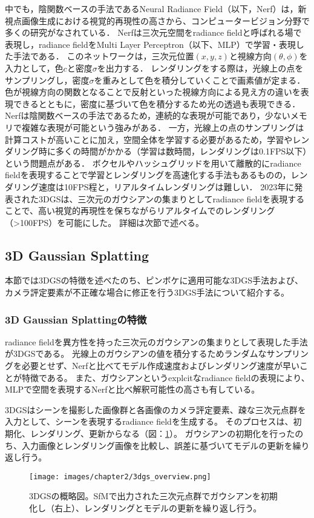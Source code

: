中でも，陰関数ベースの手法であるNeural Radiance Field（以下，Nerf）\cite{nerf}は，新視点画像生成における視覚的再現性の高さから、コンピュータービジョン分野で多くの研究がなされている．
Nerfは三次元空間をradiance fieldと呼ばれる場で表現し，radiance fieldをMulti Layer Perceptron（以下、MLP）で学習・表現した手法である．
このネットワークは，三次元位置$(x,y,z)$と視線方向$(\theta, \phi)$を入力として，色$c$と密度$\sigma$を出力する．
レンダリングをする際は，光線上の点をサンプリングし，密度$\sigma$を重みとして色を積分していくことで画素値が定まる．
色が視線方向の関数となることで反射といった視線方向による見え方の違いを表現できるとともに，密度に基づいて色を積分するため光の透過も表現できる．
Nerfは陰関数ベースの手法であるため，連続的な表現が可能であり，少ないメモリで複雑な表現が可能という強みがある．
一方，光線上の点のサンプリングは計算コストが高いことに加え，空間全体を学習する必要があるため，学習やレンダリング時に多くの時間がかかる（学習は数時間，レンダリングは0.1FPS以下）という問題点がある\cite{3dgs}．
ボクセルやハッシュグリッドを用いて離散的にradiance fieldを表現することで学習とレンダリングを高速化する手法もある\cite{plenoxels}\cite{instant-ngp}ものの，レンダリング速度は10FPS程と，リアルタイムレンダリングは難しい．
2023年に発表された3DGS\cite{3dgs}は、三次元のガウシアンの集まりとしてradiance fieldを表現することで、高い視覚的再現性を保ちながらリアルタイムでのレンダリング（>100FPS）を可能にした。
詳細は次節で述べる。

\subsection{3D Gaussian Splatting}\label{subsec:3dgs_researches} 
本節では3DGSの特徴を述べたのち、ピンボケに適用可能な3DGS手法および、カメラ評定要素が不正確な場合に修正を行う3DGS手法について紹介する。

\subsubsection{3D Gaussian Splattingの特徴}\label{subsubsec:feature_of_3dgs}
radiance fieldを異方性を持った三次元のガウシアンの集まりとして表現した手法が3DGS\cite{3dgs}である。
光線上のガウシアンの値を積分するためランダムなサンプリングを必要とせず、Nerfと比べてモデル作成速度およびレンダリング速度が早いことが特徴である。
また、ガウシアンというexplcitなradiance fieldの表現により、MLPで空間を表現するNerfと比べ解釈可能性の高さも有している。\par

3DGSはシーンを撮影した画像群と各画像のカメラ評定要素、疎な三次元点群を入力として、シーンを表現するradiance fieldを生成する。
そのプロセスは、初期化、レンダリング、更新からなる（図：\ref{fig:3dgs_overview}）。
ガウシアンの初期化を行ったのち、入力画像とレンダリング画像を比較し、誤差に基づいてモデルの更新を繰り返し行う。
\begin{figure}[h]
  \centering
  \texttt{[image: images/chapter2/3dgs\_overview.png]}
  \caption[3DGSの概略図]{3DGSの概略図。SfMで出力された三次元点群でガウシアンを初期化し（右上）、レンダリングとモデルの更新を繰り返し行う。}
  \label{fig:3dgs_overview}
\end{figure}

